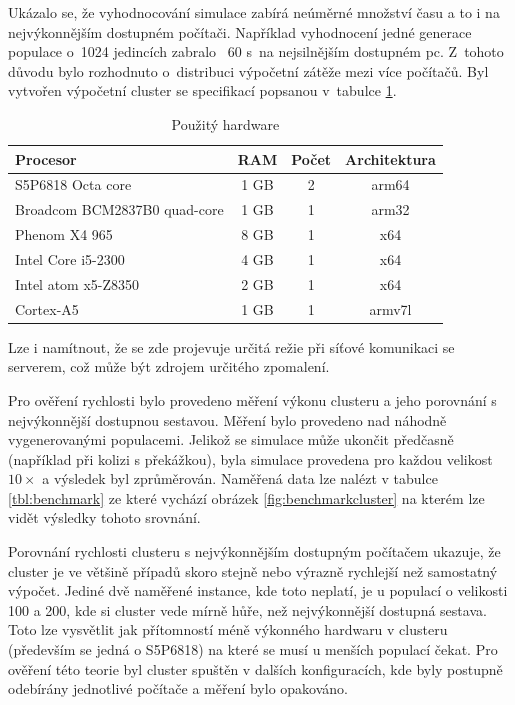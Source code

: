 \label{sec:cluster}
Ukázalo se, že vyhodnocování simulace zabírá neúměrné množství času a to i na nejvýkonnějším dostupném počítači. 
Například vyhodnocení jedné generace populace o~1024 jedincích zabralo ~60 s~na nejsilnějším dostupném pc. Z~tohoto důvodu bylo rozhodnuto o~distribuci výpočetní zátěže mezi více počítačů. Byl vytvořen výpočetní cluster se specifikací popsanou v~tabulce \ref{table:hw_table}.
\begin{table}[h!]
	\centering
	\begin{tabular}{|l|c|c|c|}
		\hline 
		Procesor & RAM & Počet & Architektura\\ 
		\hline 
		S5P6818 Octa core & 1 GB & 2 & arm64 \\ 
		\hline 
		Broadcom BCM2837B0 quad-core & 1 GB & 1 & arm32 \\ 
		\hline 
		Phenom X4 965 & 8 GB & 1 & x64 \\ 
		\hline
		Intel Core i5-2300 & 4 GB & 1 & x64 \\ 
		\hline 
		Intel atom x5-Z8350 & 2 GB & 1 & x64 \\ 
		\hline
		Cortex-A5 & 1 GB & 1 & armv7l \\
		\hline
	\end{tabular} 
	\caption{Použitý hardware}
	\label{table:hw_table}
	
\end{table}

Lze i namítnout, že se zde projevuje určitá režie při síťové komunikaci se serverem, což může být zdrojem určitého zpomalení.

Pro ověření rychlosti bylo provedeno měření výkonu clusteru a jeho porovnání s nejvýkonnější dostupnou sestavou. Měření bylo provedeno nad náhodně vygenerovanými populacemi. Jelikož se simulace může ukončit předčasně (například při kolizi s překážkou), byla simulace provedena pro každou velikost $10\times$ a výsledek byl zprůměrován. Naměřená data lze nalézt v tabulce \ref{tbl:benchmark} ze které vychází obrázek \ref{fig:benchmarkcluster} na kterém lze vidět výsledky tohoto srovnání. 

Porovnání rychlosti clusteru s nejvýkonnějším dostupným počítačem ukazuje, že cluster je ve většině případů skoro stejně nebo  výrazně rychlejší než samostatný výpočet. Jediné dvě naměřené instance, kde toto neplatí, je u populací o velikosti 100 a 200, kde si cluster vede mírně hůře, než nejvýkonnější dostupná sestava. 
Toto lze vysvětlit jak přítomností méně výkonného hardwaru v clusteru (především se jedná o S5P6818) na které se musí u menších populací čekat. Pro ověření této teorie byl cluster spuštěn v dalších konfiguracích, kde byly postupně odebírány jednotlivé počítače a měření bylo opakováno. 

